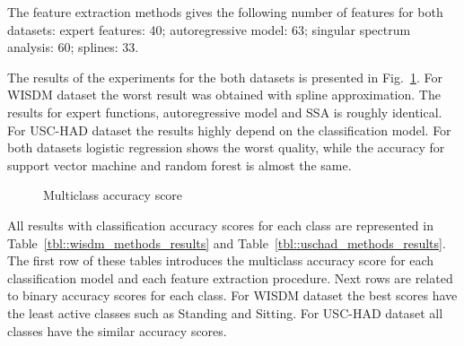 \documentclass{llncs}
\begin{document}
The feature extraction methods gives the following number of features for both datasets: expert features: 40; autoregressive model: 63; singular spectrum analysis: 60; splines: 33.

The results of the experiments for the both datasets is presented in Fig.~\ref{fig::accuracy_results}. For WISDM dataset the worst result was obtained with spline approximation. 
The results for expert functions, autoregressive model and SSA is roughly identical. For USC-HAD dataset the results highly depend on the classification model. 
For both datasets logistic regression shows the worst quality, while the accuracy for support vector machine and random forest is almost the same.

\begin{figure}[!h]
	\centering
	\caption{Multiclass accuracy score}
	\label{fig::accuracy_results}
\end{figure}

All results with classification accuracy scores for each class are represented in Table~\ref{tbl::wisdm_methods_results} and Table~\ref{tbl::uschad_methods_results}. The first row of these tables introduces the multiclass accuracy score for each classification model and each feature extraction procedure. Next rows are related to binary accuracy scores for each class. For WISDM dataset the best scores have the least active classes such as Standing and Sitting. For USC-HAD dataset all classes have the similar accuracy scores.
\end{document}
